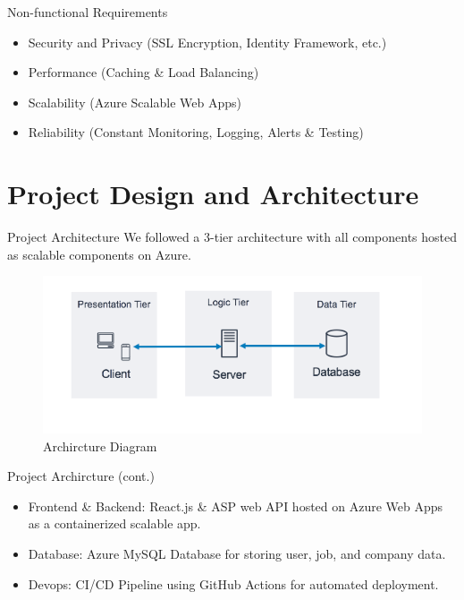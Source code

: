\documentclass{beamer}
\begin{document}
\begin{frame}{Non-functional Requirements}
    \begin{itemize}
        \item Security and Privacy (SSL Encryption, Identity Framework, etc.)
        \item Performance (Caching \& Load Balancing)
        \item Scalability (Azure Scalable Web Apps)
        \item Reliability (Constant Monitoring, Logging, Alerts \& Testing)
    \end{itemize}
\end{frame}

\section{Project Design and Architecture}

\begin{frame}{Project Architecture}
We followed a 3-tier architecture with all components hosted as scalable components on Azure.
    \begin{figure}
        \centering
        \includegraphics[width=1\textwidth]{Images/Archircture.png}
        \caption{Archircture Diagram}
    \end{figure}
\end{frame}

\begin{frame}{Project Archircture (cont.)}
    \begin{itemize}
        \item Frontend \& Backend: React.js \& ASP web API hosted on Azure Web Apps as a containerized scalable app.
        \item Database: Azure MySQL Database for storing user, job, and company data.
        \item Devops: CI/CD Pipeline using GitHub Actions for automated deployment.
    \end{itemize}
\end{frame}
\end{document}
